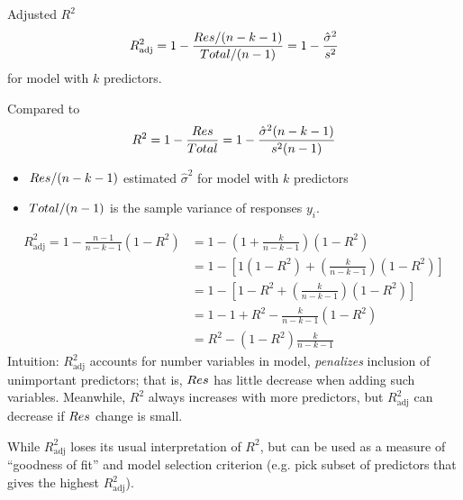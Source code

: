 \begin{Definition}{Adjusted $ R^2 $}{}
      \[ R^2_{\text{adj}}=1-\frac{\relax{Res}/(n-k-1)}{
                  \relax{Total}/(n-1)
            }=1-\frac{\hat{\sigma}^2}{s^2}  \]
      for model with $ k $ predictors.
\end{Definition}
Compared to
\[ R^2=1-\frac{\relax{Res}}{\relax{Total}}=1-\frac{\hat{\sigma}^2(n-k-1)}{s^2(n-1)}   \]
\begin{itemize}
      \item $ \relax{Res}/(n-k-1) $
            estimated $ \hat{\sigma}^2 $
            for model with $ k $ predictors
      \item $ \relax{Total}/(n-1) $ is the sample variance
            of responses $ y_i $.
\end{itemize}
\begin{align*}
      R^2_{\text{adj}}=1-\frac{n-1}{n-k-1}(1-R^2)
       & = 1-\left( 1+\frac{k}{n-k-1} \right)
      (1-R^2)                                                             \\
       & =1-\left[ 1(1-R^2)+\left( \frac{k}{n-k-1} \right)(1-R^2) \right] \\
       & =1-\left[ 1-R^2+\left( \frac{k}{n-k-1}  \right)(1-R^2) \right]   \\
       & =1-1+R^2-\frac{k}{n-k-1} (1-R^2)                                 \\
       & =R^2-(1-R^2)\frac{k}{n-k-1}
\end{align*}
Intuition: $ R^2_{\text{adj}} $
accounts for number variables in model,
\emph{penalizes} inclusion of unimportant
predictors; that is, $ \relax{Res} $
has little decrease when adding
such variables. Meanwhile, $ R^2 $
always increases with more predictors,
but $ R^2_{\text{adj}} $ can decrease
if $ \relax{Res} $ change is small.

While $ R^2_{\text{adj}} $ loses its usual
interpretation of $ R^2 $, but can be used
as a measure of ``goodness of fit''
and model selection criterion (e.g.
pick subset of predictors that gives the highest
$ R^2_{\text{adj}} $).


